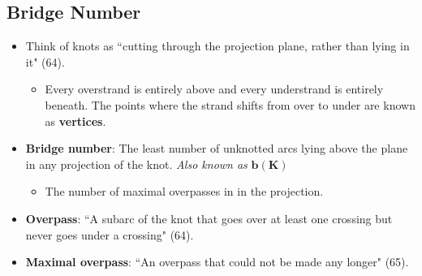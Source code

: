 \documentclass[titlepage]{article}
\numberwithin{figure}{section}
\numberwithin{table}{section}
\numberwithin{equation}{section}
\newcommand{\dq}[2]{``#1" (#2).}
\begin{document}
\subsection{Bridge Number}\label{sss:Bridge}
\begin{itemize}
    \item Think of knots as \dq{cutting through the projection plane, rather than lying in it}{64}
    \begin{itemize}
        \item Every overstrand is entirely above and every understrand is entirely beneath. The points where the strand shifts from over to under are known as \textbf{vertices}.
    \end{itemize}
    \item \textbf{Bridge number}: The least number of unknotted arcs lying above the plane in any projection of the knot. \emph{Also known as} $\mathbf{b(K)}$
    \begin{itemize}
        \item The number of maximal overpasses in in the projection.
    \end{itemize}
    \item \textbf{Overpass}: \dq{A subarc of the knot that goes over at least one crossing but never goes under a crossing}{64}
    \item \textbf{Maximal overpass}: \dq{An overpass that could not be made any longer}{65}
    \begin{figure}[h!]
        \centering
        \begin{subfigure}[b]{0.4\linewidth}
            \centering

\end{subfigure}
\end{figure}
\end{itemize}
\end{document}
